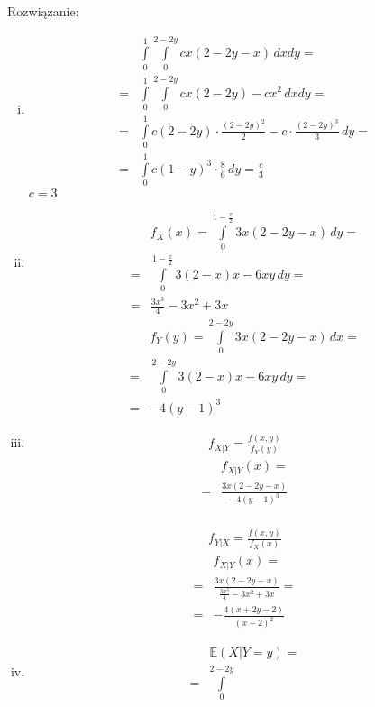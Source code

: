 Rozwiązanie:
\begin{enumerate}[(i)]
\item 
\begin{align*}
&\int\limits_{0}^{1}\int\limits_{0}^{2-2y}cx(2-2y-x)\,dxdy
=\\=&
\int\limits_{0}^{1}\int\limits_{0}^{2-2y}c x (2-2y)-c x^2\,dxdy
=\\=&
\int\limits_{0}^{1}c\left(2-2y\right)\cdot\frac{\left(2-2y\right)^2}{2}-c\cdot\frac{\left(2-2y\right)^3}{3}\,dy
=\\=&
\int\limits_{0}^{1}c\left(1-y\right)^3\cdot \frac{8}{6}\,dy
=
\frac{c}{3}
\end{align*}
$ c=3 $
\item 
\begin{align*}
&f_X(x)
=
\int\limits_{0}^{1-\frac{x}{2}}3x(2-2y-x)\,dy
=\\=&
\int\limits_{0}^{1-\frac{x}{2}}3 (2-x) x-6 x y\,dy
=\\=&
\frac{3 x^3}{4}-3 x^2+3 x
\end{align*}
\begin{align*}
&f_Y(y)
=
\int\limits_{0}^{2-2y}3x(2-2y-x)\,dx
=\\=&
\int\limits_{0}^{2-2y}3 (2-x) x-6 x y\,dy
=\\=&
-4 (y-1)^3
\end{align*}
\item 
\begin{multicols}{2}
\begin{gather*}
f_{X|Y}
=
\frac{f(x,y)}{f_Y(y)}
\end{gather*}
\begin{align*}
&f_{X|Y}(x)
=\\=&
\frac{3x(2-2y-x)}{-4 (y-1)^3}
\end{align*}
\\
\begin{gather*}
f_{Y|X}
=
\frac{f(x,y)}{f_X(x)}
\end{gather*}
\begin{align*}
&f_{X|Y}(x)
=\\=&
\frac{3x (2-2y-x)}{\frac{3 x^3}{4}-3 x^2+3 x}
=\\=&
-\frac{4 (x+2 y-2)}{(x-2)^2}
\end{align*}
\end{multicols}
\item 
\begin{minipage}[t]{0.5\textwidth}
\begin{align*}
&\mathbb E \left(X|Y=y\right)
=\\=&
\int\limits_{0}^{2-2y}

\end{align*}
\end{minipage}
\end{enumerate}
